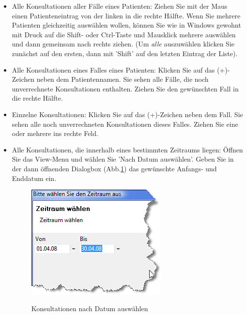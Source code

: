 \documentclass[a4paper]{scrartcl}
\begin{document}
\begin{itemize}
\item Alle Konsultationen aller Fälle eines Patienten: Ziehen Sie mit der Maus einen Patienteneintrag von der linken in die rechte Hälfte. Wenn Sie mehrere Patienten gleichzeitig auswählen wollen, können Sie wie in Windows gewohnt mit Druck auf die Shift- oder Ctrl-Taste und Mausklick mehrere auswählen und dann gemeinsam nach rechts ziehen. (Um \textit{alle} auszuwählen klicken Sie zunächst auf den ersten, dann mit 'Shift' auf den letzten Eintrag der Liste).
\item Alle Konsultationen eines Falles eines Patienten: Klicken Sie auf das (+)-Zeichen neben dem Patientennamen. Sie sehen alle Fälle, die noch unverrechnete Konsultationen enthalten. Ziehen Sie den gewünschten Fall in die rechte Hälfte.
\item Einzelne Konsultationen: Klicken Sie auf das (+)-Zeichen neben dem Fall. Sie sehen alle noch unverrechneten Konsultationen dieses Falles. Ziehen Sie eine oder mehrere ins rechte Feld.
\item Alle Konsultationen, die innerhalb eines bestimmten Zeitraums liegen: Öffnen Sie das View-Menu und wählen Sie 'Nach Datum auswählen'. Geben Sie in der dann öffnenden Dialogbox (Abb.\ref{fig:abr10}) das gewünschte Anfangs- und Enddatum ein.
\begin{figure}
  \includegraphics{abr10}\\
  \caption{Konsultationen nach Datum auswählen}\label{fig:abr10}
\end{figure}


\end{itemize}
\end{document}
